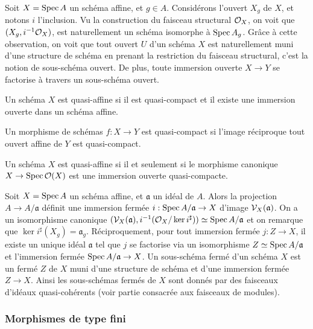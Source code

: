 Soit $X=\operatorname{Spec} A$ un schéma affine, et $g\in A$. Considérons l'ouvert $X_g$ de $X$, et notons $i$ l'inclusion. Vu la construction du faisceau structural $\mathcal{O}_X$, on voit que $(X_g, i^{-1}\mathcal{O}_X)$, est naturellement un schéma isomorphe à $\operatorname{Spec} A_g$. Grâce à cette observation, on voit que tout ouvert $U$ d'un schéma $X$ est naturellement muni d'une structure de schéma en prenant la restriction du faisceau structural, c'est la notion de sous-schéma ouvert. De plus, toute immersion ouverte $X\rightarrow Y$ se factorise à travers un sous-schéma ouvert.

\begin{defn}
Un schéma $X$ est quasi-affine si il est quasi-compact et il existe une immersion ouverte dans un schéma affine.
\end{defn}

\begin{defn}
Un morphisme de schémas $f:X\rightarrow Y$ est quasi-compact si l'image réciproque tout ouvert affine de $Y$ est quasi-compact. 
\end{defn}

\begin{prop}\label{QuasiAffCritere}
Un schéma $X$ est quasi-affine si il et seulement si le morphisme canonique $X\rightarrow \operatorname{Spec} \mathcal{O}(X)$ est une immersion ouverte quasi-compacte.
\end{prop}

Soit $X=\operatorname{Spec} A$ un schéma affine, et $\mathfrak{a}$ un idéal de $A$. Alors la projection $A\rightarrow A/\mathfrak{a}$ définit une immersion fermée $i:\operatorname{Spec} A/\mathfrak{a}\rightarrow X$ d'image $\mathcal{V}_X(\mathfrak{a})$. On a un isomorphisme canonique $(\mathcal{V}_X(\mathfrak{a}), i^{-1}(\mathcal{O}_X/\ker i^\sharp))\simeq \operatorname{Spec} A/\mathfrak{a}$ et on remarque que $\ker i^\sharp(X_g)=\mathfrak{a}_g$. Réciproquement, pour tout immersion fermée $j:Z\rightarrow X$, il existe un unique idéal $\mathfrak{a}$ tel que $j$ se factorise via un isomorphisme $Z\simeq \operatorname{Spec} A/\mathfrak{a}$ et l'immersion fermée $\operatorname{Spec} A/\mathfrak{a}\rightarrow X$. Un sous-schéma fermé d'un schéma $X$ est un fermé $Z$ de $X$ muni d'une structure de schéma et d'une immersion fermée $Z\rightarrow X$. Ainsi les sous-schémas fermés de $X$ sont donnés par des faisceaux d'idéaux quasi-cohérents (voir partie consacrée aux faisceaux de modules).



\subsubsection{Morphismes de type fini}


